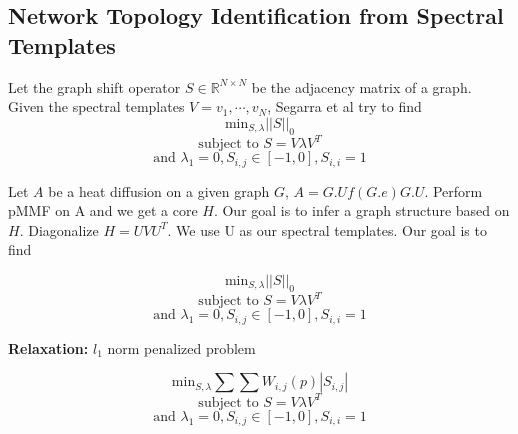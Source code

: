 \documentclass[a4paper]{article}
\newcommand{\R}{\mathbb{R}}
\begin{document}
\subsection{Network Topology Identification from Spectral Templates}

Let the graph shift operator $S \in \R^{N\times N}$ be the adjacency matrix of a graph. Given the spectral templates $V = {v_1, \cdots, v_N}$, Segarra et al try to find
$$\text{min}_{S, \lambda} ||S||_0 $$
$$\text{subject to } S = V\lambda V^T $$
$$\text{and } \lambda_{1} =0, S_{i,j} \in [-1,0], S_{i,i} =1$$

Let $A$ be a heat diffusion on a given graph $G$, $A = G.Uf(G.e)G.U$. Perform pMMF on A and we get a core $H$. Our goal is to infer a graph structure based on $H$. Diagonalize $H = UVU^T$. We use U as our spectral templates. Our goal is to find

$$\text{min}_{S, \lambda} ||S||_0 $$
$$\text{subject to } S = V\lambda V^T $$
$$\text{and } \lambda_{1} =0, S_{i,j} \in [-1,0], S_{i,i} =1$$

\textbf{Relaxation:} $l_1$ norm penalized problem

$$\text{min}_{S, \lambda} \sum\sum W_{i,j}(p)|S_{i,j}| $$
$$\text{subject to } S = V\lambda V^T $$
$$\text{and } \lambda_{1} =0, S_{i,j} \in [-1,0], S_{i,i} =1$$

\end{document}
